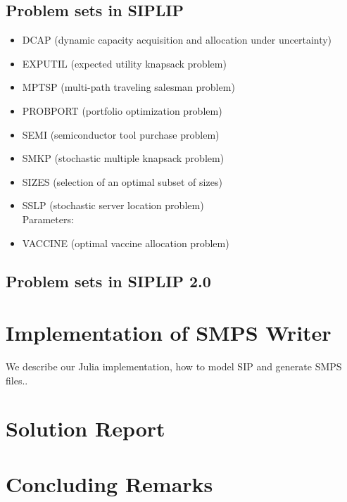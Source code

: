 \subsection{Problem sets in SIPLIP}
\begin{itemize}
	\item DCAP (dynamic capacity acquisition and allocation under uncertainty)
	\item EXPUTIL (expected utility knapsack problem)
	\item MPTSP (multi-path traveling salesman problem)
	\item PROBPORT (portfolio optimization problem)
	\item SEMI (semiconductor tool purchase problem)
	\item SMKP (stochastic multiple knapsack problem)
	\item SIZES (selection of an optimal subset of sizes)
	\item SSLP (stochastic server location problem)\\
	Parameters:\\
	
	\item VACCINE (optimal vaccine allocation problem)
\end{itemize}
\subsection{Problem sets in SIPLIP 2.0}




\section{Implementation of SMPS Writer}

We describe our Julia implementation, how to model SIP and generate SMPS files..

\section{Solution Report}

\section{Concluding Remarks}





